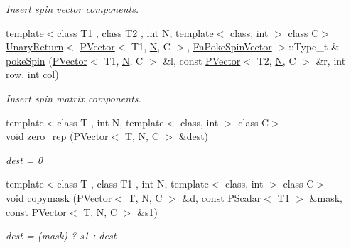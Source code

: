 \begin{DoxyCompactItemize}
\begin{DoxyCompactList}\small\item\em Insert spin vector components. \end{DoxyCompactList}\item 
{\footnotesize template$<$class T1 , class T2 , int N, template$<$ class, int $>$ class C$>$ }\\\mbox{\hyperlink{structENSEM_1_1UnaryReturn}{Unary\+Return}}$<$ \mbox{\hyperlink{classENSEM_1_1PVector}{P\+Vector}}$<$ T1, \mbox{\hyperlink{operator__name__util_8cc_a7722c8ecbb62d99aee7ce68b1752f337}{N}}, C $>$, \mbox{\hyperlink{structENSEM_1_1FnPokeSpinVector}{Fn\+Poke\+Spin\+Vector}} $>$\+::Type\+\_\+t \& \mbox{\hyperlink{group__primvector_ga89df0ab0f1f2a2f4374c848c2180493f}{poke\+Spin}} (\mbox{\hyperlink{classENSEM_1_1PVector}{P\+Vector}}$<$ T1, \mbox{\hyperlink{operator__name__util_8cc_a7722c8ecbb62d99aee7ce68b1752f337}{N}}, C $>$ \&l, const \mbox{\hyperlink{classENSEM_1_1PVector}{P\+Vector}}$<$ T2, \mbox{\hyperlink{operator__name__util_8cc_a7722c8ecbb62d99aee7ce68b1752f337}{N}}, C $>$ \&r, int row, int col)
\begin{DoxyCompactList}\small\item\em Insert spin matrix components. \end{DoxyCompactList}\item 
{\footnotesize template$<$class T , int N, template$<$ class, int $>$ class C$>$ }\\void \mbox{\hyperlink{group__primvector_gac04295d27d75b37281c54b208d478624}{zero\+\_\+rep}} (\mbox{\hyperlink{classENSEM_1_1PVector}{P\+Vector}}$<$ T, \mbox{\hyperlink{operator__name__util_8cc_a7722c8ecbb62d99aee7ce68b1752f337}{N}}, C $>$ \&dest)
\begin{DoxyCompactList}\small\item\em dest = 0 \end{DoxyCompactList}\item 
{\footnotesize template$<$class T , class T1 , int N, template$<$ class, int $>$ class C$>$ }\\void \mbox{\hyperlink{group__primvector_ga6018d56f682cba0fc157b7df0ac3b403}{copymask}} (\mbox{\hyperlink{classENSEM_1_1PVector}{P\+Vector}}$<$ T, \mbox{\hyperlink{operator__name__util_8cc_a7722c8ecbb62d99aee7ce68b1752f337}{N}}, C $>$ \&d, const \mbox{\hyperlink{classENSEM_1_1PScalar}{P\+Scalar}}$<$ T1 $>$ \&mask, const \mbox{\hyperlink{classENSEM_1_1PVector}{P\+Vector}}$<$ T, \mbox{\hyperlink{operator__name__util_8cc_a7722c8ecbb62d99aee7ce68b1752f337}{N}}, C $>$ \&s1)
\begin{DoxyCompactList}\small\item\em dest = (mask) ? s1 \+: dest \end{DoxyCompactList}\item 

\end{DoxyCompactItemize}
